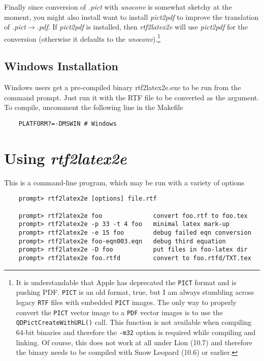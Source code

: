 \documentclass{article}
\def\rtf2latex2e{{\it rtf2latex2e}}
\begin{document}
Finally since conversion of \textit{.pict} with \textit{unoconv} is somewhat sketchy at the moment, you might also install want to install \textit{pict2pdf} to improve the translation of \textit{.pict}$\rightarrow$\textit{.pdf}. If \textit{pict2pdf} is installed, then {\rtf2latex2e} will use \textit{pict2pdf} for the conversion (otherwise it defaults to the \textit{unoconv}).\footnote{It is understandable that Apple has deprecated the \texttt{PICT} format and is pushing PDF.  \texttt{PICT} is an old format, true, but I am always stumbling across legacy \texttt{RTF} files with embedded \texttt{PICT} images.  The only way to properly convert the \texttt{PICT} vector image to a \texttt{PDF} vector images is to use the \texttt{QDPictCreateWithURL()} call.  This function is not available when compiling 64-bit binaries and therefore the \texttt{-m32} option is required while compiling and linking. Of course, this does not work at all under Lion (10.7) and therefore the binary needs to be compiled with Snow Leopard (10.6) or earlier.}  

\subsection{Windows Installation}
Windows users get a pre-compiled binary rtf2latex2e.exe to be run from
the command prompt. Just run it with the RTF file to be converted as the argument.
To compile, uncomment the following line in the Makefile
\begin{verbatim}
    PLATFORM?=-DMSWIN # Windows
\end{verbatim}

\section{Using \rtf2latex2e}

This is a command-line program, which may be run with a variety of options
\begin{verbatim}
    prompt> rtf2latex2e [options] file.rtf
    
    prompt> rtf2latex2e foo              convert foo.rtf to foo.tex
    prompt> rtf2latex2e -p 33 -t 4 foo   minimal latex mark-up
    prompt> rtf2latex2e -e 15 foo        debug failed eqn conversion
    prompt> rtf2latex2e foo-eqn003.eqn   debug third equation 
    prompt> rtf2latex2e -D foo           put files in foo-latex dir
    prompt> rtf2latex2e foo.rtfd         convert to foo.rtfd/TXT.tex
\end{verbatim}
\end{document}
